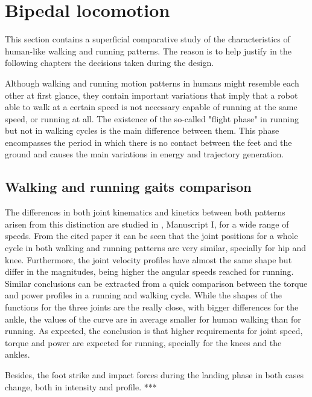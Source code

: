 
\section{Bipedal locomotion} %
\label{sec:bipedal_walking_and_running_gaits}
This section contains a superficial comparative study of the characteristics of human-like walking and running patterns.
The reason is to help justify in the following chapters the decisions taken during the design.

Although walking and running motion patterns in humans might resemble each other at first glance, they contain important variations that imply that a robot able to walk at a certain speed is not necessary capable of running at the same speed, or running at all.
The existence of the so-called "flight phase" in running but not in walking cycles is the main difference between them.
This phase encompasses the period in which there is no contact between the feet and the ground and causes the main variations in energy and trajectory generation.

\subsection{Walking and running gaits comparison} %
\label{sub:walk_and_run_comparison}
The differences in both joint kinematics and kinetics between both patterns arisen from this distinction are studied in \cite{grimmer}, Manuscript I, for a wide range of speeds.
From the cited paper it can be seen that the joint positions for a whole cycle in both walking and running patterns are very similar, specially for hip and knee.
Furthermore, the joint velocity profiles have almost the same shape but differ in the magnitudes, being higher the angular speeds reached for running.
Similar conclusions can be extracted from a quick comparison between the torque and power profiles in a running and walking cycle.
While the shapes of the functions for the three joints are the really close, with bigger differences for the ankle, the values of the curve are in average smaller for human walking than for running.
As expected, the conclusion is that higher requirements for joint speed, torque and power are expected for running, specially for the knees and the ankles.

Besides, the foot strike and impact forces during the landing phase in both cases change, both in intensity and profile. ***




